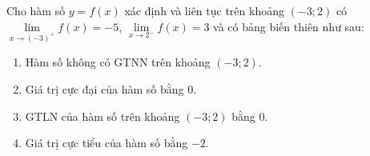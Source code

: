 \begin{baitap}
	Cho hàm số $y=f(x)$ xác định và liên tục trên khoảng $(-3; 2)$ có $\lim\limits_{x \to (-3)^+} f(x) = -5$, $\lim\limits_{x \to 2^-} f(x) = 3$ và có bảng biến thiên như sau:
	
	\begin{minipage}{0.55\textwidth}
		\begin{enumerate}
			\item Hàm số không có GTNN trên khoảng $(-3; 2)$.
			\item Giá trị cực đại của hàm số bằng $0$.
			\item GTLN của hàm số trên khoảng $(-3; 2)$ bằng $0$.
			\item Giá trị cực tiểu của hàm số bằng $-2$.
		\end{enumerate}
	\end{minipage}	
	\begin{minipage}{0.45\textwidth}
		\begin{center}
		\end{center}
	\end{minipage}
	\begin{traloi}
	\end{traloi}
\end{baitap}

